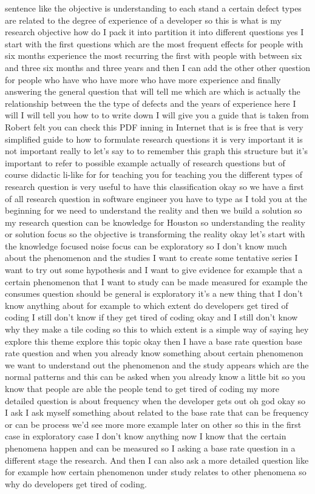 \documentclass[conference, compsoc, twoside]{IEEEtran}
\begin{document}
sentence like the objective is understanding to each stand a certain defect types are related to the degree of experience of a developer so this is what is my research objective how do I pack it into partition it into different questions yes I start with the first questions which are the most frequent effects for people with six months experience the most recurring the first with people with between six and three six months and three years and then I can add the other other question for people who have who have more who have more experience and finally answering the general question that will tell me which are which is actually the relationship between the the type of defects and the years of experience here I will I will tell you how to to write down I will give you a guide that is taken from Robert felt you can check this PDF inning in Internet that is is free that is very simplified guide to how to formulate research questions it is very important it is not important really to let's say to to remember this graph this structure but it's important to refer to possible example actually of research questions but of course didactic li-like for for teaching you for teaching you the different types of research question is very useful to have this classification okay so we have a first of all research question in software engineer you have to type as I told you at the beginning for we need to understand the reality and then we build a solution so my research question can be knowledge for Houston so understanding the reality or solution focus so the objective is transforming the reality okay let's start with the knowledge focused noise focus can be exploratory so I don't know much about the phenomenon and the studies I want to create some tentative series I want to try out some hypothesis and I want to give evidence for example that a certain phenomenon that I want to study can be made measured for example the consumes question should be general is exploratory it's a new thing that I don't know anything about for example to which extent do developers get tired of coding I still don't know if they get tired of coding okay and I still don't know why they make a tile coding so this to which extent is a simple way of saying hey explore this theme explore this topic okay then I have a base rate question base rate question and when you already know something about certain phenomenon we want to understand out the phenomenon and the study appears which are the normal patterns and this can be asked when you already know a little bit so you know that people are able the people tend to get tired of coding my more detailed question is about frequency when the developer gets out oh god okay so I ask I ask myself something about related to the base rate that can be frequency or can be process we'd see more more example later on other so this in the first case in exploratory case I don't know anything now I know that the certain phenomena happen and can be measured so I asking a base rate question in a different stage the research.
And then I can also ask a more detailed question like for example how certain phenomenon under study relates to other phenomena so why do developers get tired of coding. 
\end{document}
